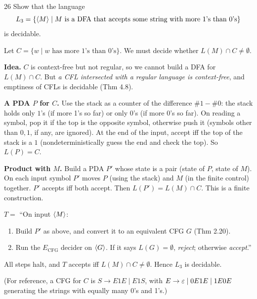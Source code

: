 \begin{question}{26}
Show that the language
\[L_3=\{\langle M\rangle\mid M \text{ is a DFA that accepts some string with more 1's than 0's}\}\]
is decidable.
\end{question}
\begin{soln}
Let $C=\{w\mid w \text{ has more 1's than 0's}\}$. We must decide whether $L(M)\cap C\neq\emptyset$.

\textbf{Idea.} $C$ is context-free but not regular, so we cannot build a DFA for $L(M)\cap C$. But \emph{a CFL intersected with a regular language is context-free}, and emptiness of CFLs is decidable (Thm 4.8).

\textbf{A PDA $P$ for $C$.} Use the stack as a counter of the difference $\#1-\#0$: the stack holds only $1$'s (if more 1's so far) or only $0$'s (if more 0's so far). On reading a symbol, pop it if the top is the opposite symbol, otherwise push it (symbols other than $0,1$, if any, are ignored). At the end of the input, accept iff the top of the stack is a $1$ (nondeterministically guess the end and check the top). So $L(P)=C$.

\textbf{Product with $M$.} Build a PDA $P'$ whose state is a pair (state of $P$, state of $M$). On each input symbol $P'$ moves $P$ (using the stack) and $M$ (in the finite control) together. $P'$ accepts iff both accept. Then $L(P')=L(M)\cap C$. This is a finite construction.

$T=$ ``On input $\langle M\rangle$:
\begin{enumerate}
\item Build $P'$ as above, and convert it to an equivalent CFG $G$ (Thm 2.20).
\item Run the $E_{\mathrm{CFG}}$ decider on $\langle G\rangle$. If it says $L(G)=\emptyset$, \emph{reject}; otherwise \emph{accept}.''
\end{enumerate}
All steps halt, and $T$ accepts iff $L(M)\cap C\neq\emptyset$. Hence $L_3$ is decidable.

(For reference, a CFG for $C$ is $S\to E1E\mid E1S$, with $E\to \varepsilon\mid 0E1E\mid 1E0E$ generating the strings with equally many 0's and 1's.)
\end{soln}

